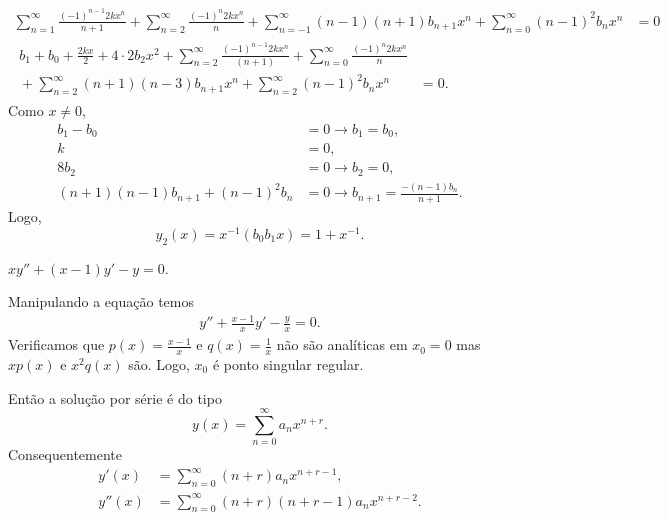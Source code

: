 \documentclass[a4paper,12pt, leqno, answers]{exam}
\begin{document}
\begin{questions}
\begin{solution}
\begin{align*}
            \sum_{n = 1}^\infty \frac{\left( -1 \right)^{n - 1} 2 k x^n}{n + 1} + \sum_{n = 2}^\infty \frac{\left( -1 \right)^n 2 k x^n}{n} + \sum_{n = -1}^\infty \left( n - 1 \right) \left( n + 1 \right) b_{n + 1} x^n + \sum_{n = 0}^\infty \left( n - 1 \right)^2 b_n x^n &= 0 \\
            \begin{split}
                b_1 + b_0 + \frac{2 k x}{2} + 4 \cdot 2 b_2 x^2 + \sum_{n = 2}^\infty \frac{\left( -1 \right)^{n - 1} 2 k x^n}{\left( n + 1 \right)} + \sum_{n = 0}^\infty \frac{\left( -1 \right)^n 2 k x^n}{n} \\ {}+ \sum_{n = 2}^\infty \left( n + 1 \right) \left( n - 3 \right) b_{n + 1} x^n + \sum_{n = 2}^\infty \left( n - 1 \right)^2 b_n x^n &= 0.
            \end{split}
        \end{align*}
        Como $x \neq 0$,
        \begin{align*}
            b_1 - b_0 &= 0 \rightarrow b_1 = b_0, \\
            k &= 0, \\
            8 b_2 &= 0 \rightarrow b_2 = 0, \\
            \left( n + 1 \right) \left( n - 1 \right) b_{n + 1} + \left( n - 1 \right)^2 b_n &= 0 \rightarrow b_{n + 1} = \frac{- \left( n - 1 \right) b_n}{n + 1}.
        \end{align*}
        Logo,
        \[
        y_2(x) = x^{-1} \left( b_0 b_1 x \right) = 1 + x^{-1}.
        \]
    \end{solution}

    \question $x y'' + \left( x - 1 \right) y' - y = 0$.
    \begin{solution}
        Manipulando a equa\c{c}\~{a}o temos
        \begin{align*}
            y'' + \frac{x - 1}{x} y' - \frac{y}{x} = 0.
        \end{align*}
        Verificamos que $p(x) = \frac{x - 1}{x}$ e $q(x) = \frac{1}{x}$ n\~{a}o s\~{a}o anal\'{i}ticas em $x_0 = 0$ mas $x p(x)$ e $x^2 q(x)$ s\~{a}o. Logo, $x_0$ \'{e} ponto singular regular.

        Ent\~{a}o a solu\c{c}\~{a}o por s\'{e}rie \'{e} do tipo
        \[
        y\left( x \right) = \sum_{n = 0}^\infty a_n x^{n + r}.
        \]
        Consequentemente
        \begin{align*}
            y'(x) &= \sum_{n = 0}^\infty \left( n + r \right) a_n x^{n + r - 1}, \\
            y''(x) &= \sum_{n = 0}^\infty \left( n + r \right) \left( n + r - 1 \right) a_n x^{n + r - 2}.
        \end{align*}
        

\end{solution}
\end{questions}
\end{document}
